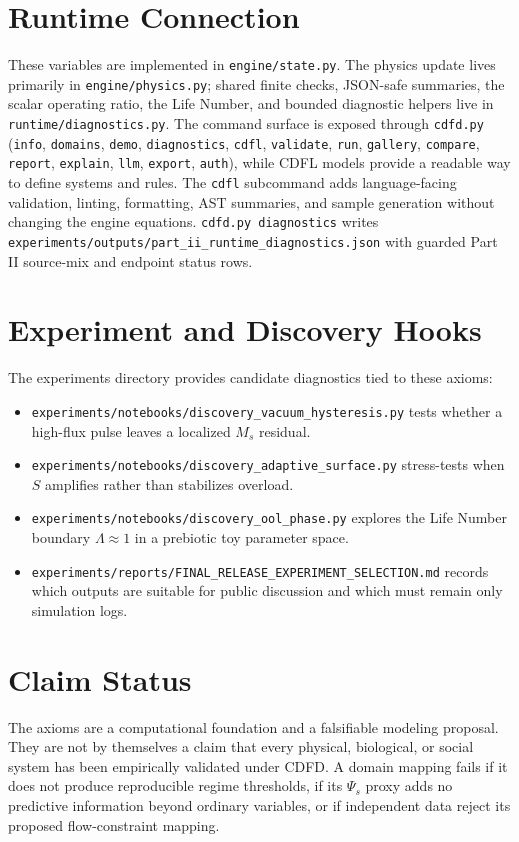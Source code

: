 \documentclass[12pt,a4paper]{article}
\begin{document}
\section{Runtime Connection}
These variables are implemented in \texttt{engine/state.py}. The physics update
lives primarily in \texttt{engine/physics.py}; shared finite checks, JSON-safe
summaries, the scalar operating ratio, the Life Number, and bounded diagnostic
helpers live in \texttt{runtime/diagnostics.py}. The command surface is exposed
through \texttt{cdfd.py} (\texttt{info}, \texttt{domains}, \texttt{demo},
\texttt{diagnostics}, \texttt{cdfl}, \texttt{validate}, \texttt{run},
\texttt{gallery}, \texttt{compare}, \texttt{report}, \texttt{explain},
\texttt{llm}, \texttt{export}, \texttt{auth}), while CDFL models provide a
readable way to define systems and rules. The \texttt{cdfl} subcommand adds
language-facing validation, linting, formatting, AST summaries, and sample
generation without changing the engine equations. \texttt{cdfd.py diagnostics}
writes
\texttt{experiments/outputs/part\_ii\_runtime\_diagnostics.json} with guarded
Part II source-mix and endpoint status rows.

\section{Experiment and Discovery Hooks}
The experiments directory provides candidate diagnostics tied to these axioms:
\begin{itemize}
    \item \texttt{experiments/notebooks/discovery\_vacuum\_hysteresis.py}
    tests whether a high-flux pulse leaves a localized $M_s$ residual.
    \item \texttt{experiments/notebooks/discovery\_adaptive\_surface.py}
    stress-tests when $S$ amplifies rather than stabilizes overload.
    \item \texttt{experiments/notebooks/discovery\_ool\_phase.py}
    explores the Life Number boundary $\Lambda \approx 1$ in a prebiotic toy
    parameter space.
    \item \texttt{experiments/reports/FINAL\_RELEASE\_EXPERIMENT\_SELECTION.md}
    records which outputs are suitable for public discussion and which must
    remain only simulation logs.
\end{itemize}

\section{Claim Status}
The axioms are a computational foundation and a falsifiable modeling proposal.
They are not by themselves a claim that every physical, biological, or social
system has been empirically validated under CDFD. A domain mapping fails if it
does not produce reproducible regime thresholds, if its $\Psi_s$ proxy adds no
predictive information beyond ordinary variables, or if independent data reject
its proposed flow-constraint mapping.
\end{document}
